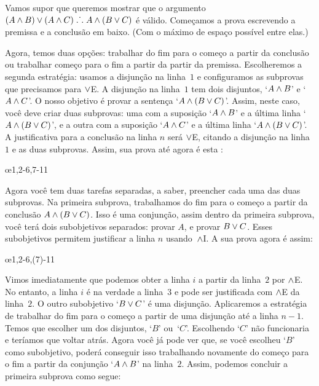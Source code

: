 Vamos supor que queremos mostrar que o argumento $(A \wedge B) \vee (A \wedge C) \mathrel{\ldotp\dot{}\,\ldotp} A \wedge (B \vee C)$ \'e v\'alido. Come\c camos a prova escrevendo a premissa e a conclus\~ao em baixo. (Com o m\'aximo de espa\c co poss\'ivel entre elas.) 
\begin{fitchproof}
\ellipsesline
\end{fitchproof}
Agora, temos duas op\c c\~oes: trabalhar do fim para o come\c co a partir da conclus\~ao ou trabalhar come\c co para o fim a partir da partir da premissa. Escolheremos a segunda estrat\'egia: usamos a disjun\c c\~ao na linha~$1$ e configuramos as subprovas que precisamos para  $\vee$E. A disjun\c c\~ao na linha~$1$ tem dois disjuntos, `$A \wedge B$' e `$A \wedge C$'. 
O nosso objetivo \'e provar a senten\c ca `$A \wedge (B \vee C)$'. Assim, neste caso, voc\^e  deve criar duas subprovas:  uma com a suposi\c c\~ao `$A \wedge B$' e a \'ultima linha `$A \wedge (B \vee C)$', e a  outra com a suposi\c c\~ao `$A \wedge C$' e a \'ultima linha `$A \wedge (B \vee C)$'. A justificativa para a conclus\~ao na linha $n$  ser\'a  $\vee$E,  citando a disjun\c c\~ao na linha~$1$ e as duas subprovas. Assim, sua prova at\'e  agora \'e esta :
 

\begin{fitchproof}
	\open
	\ellipsesline 
	\close
	\open
	\ellipsesline
	\close
	\oe{1,2-6,7-11}
\end{fitchproof}
Agora voc\^e tem duas tarefas separadas, a saber,  preencher cada uma das duas subprovas. Na primeira subprova, trabalhamos do fim para o come\c co a partir da conclus\~ao $A \wedge (B \vee C)$. Isso \'e uma conjun\c c\~ao, assim dentro da primeira subprova, voc\^e ter\'a dois subobjetivos separados: provar $A$, e provar $B \vee C$. Esses subobjetivos permitem justificar a linha $n$ usando~$\wedge$I. A sua prova agora \'e assim:
 

\begin{fitchproof}
	\open
	\ellipsesline
	\ellipsesline
	\close
	\open
	\ellipsesline
	\close
	\oe{1,2-6,(7)-11}
\end{fitchproof}
Vimos imediatamente que podemos obter a linha $i$ a partir da linha~$2$ por $\wedge$E. No entanto, a linha $i$ \'e na verdade a linha~$3$ e pode ser justificada com $\wedge$E  da linha~$2$. O outro subobjetivo `$B \vee C$' \'e uma disjun\c c\~ao.
Aplicaremos a estrat\'egia de trabalhar do fim para o come\c co a partir de uma disjun\c c\~ao at\'e a linha $n-1$. Temos que escolher um dos disjuntos, `$B$' ou~`$C$'. 
Escolhendo `$C$'  n\~ao funcionaria e ter\'iamos que voltar atr\'as. Agora voc\^e j\'a pode ver que, se voc\^e escolheu `$B$' como subobjetivo, poder\'a conseguir isso trabalhando novamente do come\c co para o fim a partir da conjun\c c\~ao `$A \wedge B$' na linha~$2$. Assim, podemos concluir a primeira subprova como segue:
 

